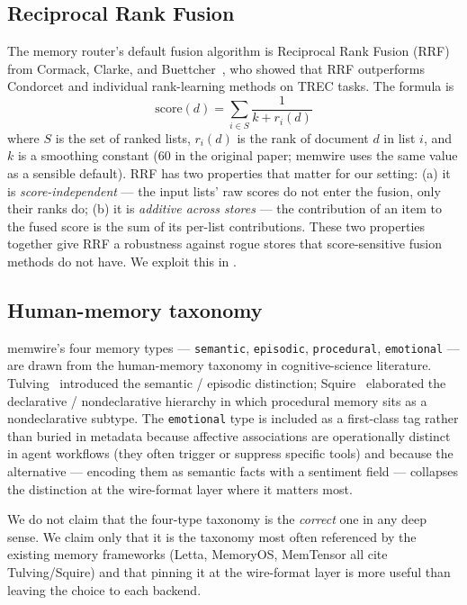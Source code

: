 \documentclass[11pt,letterpaper,twocolumn]{article}
\begin{document}
\subsection{Reciprocal Rank Fusion}
\label{sec:related-rrf}

The memory router's default fusion algorithm is Reciprocal Rank Fusion (RRF) from Cormack, Clarke, and Buettcher~\cite{cormack2009rrf}, who showed that RRF outperforms Condorcet and individual rank-learning methods on TREC tasks. The formula is
\[
  \mathrm{score}(d) = \sum_{i \in S} \frac{1}{k + r_i(d)}
\]
where $S$ is the set of ranked lists, $r_i(d)$ is the rank of document $d$ in list $i$, and $k$ is a smoothing constant (60 in the original paper; memwire uses the same value as a sensible default). RRF has two properties that matter for our setting: (a) it is \emph{score-independent} --- the input lists' raw scores do not enter the fusion, only their ranks do; (b) it is \emph{additive across stores} --- the contribution of an item to the fused score is the sum of its per-list contributions. These two properties together give RRF a robustness against rogue stores that score-sensitive fusion methods do not have. We exploit this in .

\subsection{Human-memory taxonomy}

memwire's four memory types --- \texttt{semantic}, \texttt{episodic}, \texttt{procedural}, \texttt{emotional} --- are drawn from the human-memory taxonomy in cognitive-science literature. Tulving~\cite{tulving1972episodic} introduced the semantic / episodic distinction; Squire~\cite{squire1992declarative} elaborated the declarative / nondeclarative hierarchy in which procedural memory sits as a nondeclarative subtype. The \texttt{emotional} type is included as a first-class tag rather than buried in metadata because affective associations are operationally distinct in agent workflows (they often trigger or suppress specific tools) and because the alternative --- encoding them as semantic facts with a sentiment field --- collapses the distinction at the wire-format layer where it matters most.

We do not claim that the four-type taxonomy is the \emph{correct} one in any deep sense. We claim only that it is the taxonomy most often referenced by the existing memory frameworks (Letta, MemoryOS, MemTensor all cite Tulving/Squire) and that pinning it at the wire-format layer is more useful than leaving the choice to each backend.
\end{document}
